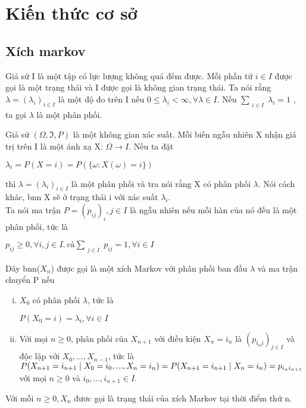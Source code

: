 
\chapter{Kiến thức cơ sở}
\thispagestyle{empty}

\section{Xích markov}
\dn Giả sử I là một tập có lực lượng không quá đếm được. Mỗi phần tử $i\in I$ được gọi là một trạng thái và I được gọi là không gian trạng thái. Ta nói rằng $\lambda = (\lambda_i)_{i \in I}$ là một độ đo trên I nếu $0 \leq \lambda_i  < \infty , \forall \lambda \in I$. Nếu $\sum_{\substack{i \in I}} {\lambda_i } = 1$ , ta gọi $\lambda$ là một phân phối.

Giả sử $(\Omega , \Im , P)$ là một không gian xác suất. Mỗi biến ngẫu nhiên X nhận giá trị trên I là một ánh xạ X: $\Omega \to I$. Nếu ta đặt
\begin{center}
$\lambda_i = P(X = i) = P(\{\omega: X(\omega) = i\})$
\end{center}
thì $\lambda = (\lambda_i)_{i \in I}$ là một phân phối và tra nói rằng X có phân phối $\lambda$. Nói cách khác, bnn X sẽ ở trạng thái i với xác suất $\lambda_i$.\\
Ta nói ma trận $P = (p_{ij})_i,j \in I$ là ngẫu nhiên nếu mỗi hàn của nó đều là một phân phối, tức là
\begin{center}
$p_{ij} \geq 0, \forall i, j \in I, và \sum_{\substack{j \in I}}{p_{ij}} = 1, \forall i \in I$
\end{center}
\hdn
\dn Dãy bnn($X_n$) được gọi là một xích Markov với phân phối ban đầu $\lambda$ và ma trận chuyển P nếu
\begin{enumerate}[i)]
\item\label{dk1} $X_0$ có phân phối $\lambda$, tức là
\begin{center}
$P(X_0 = i) = \lambda_i , \forall i \in I$
\end{center}
\item\label{dk2}Với mọi $n\geq 0$, phân phối của $X_{n+1}$ với điều kiện $X_n = i_n$ là $(p_{i_n j})_{j \in I}$ và độc lập với $X_0,...,X_{n-1}$, tức là\\
$P(X_{n+1}=i_{n+1}\mid X_0=i_0, ..., X_n = i_n) =P(X_{n+1} = i_{n+1} \mid X_n = i_n) \\=p_{i_n i_{n+1}}$ với mọi $n \geq 0$ và $i_0, ..., i_{n+1} \in I.$
\end{enumerate}
Với mỗi $n \geq 0, X_n$ đươc gọi là trạng thái của xích Markov tại thời điểm thứ n.

